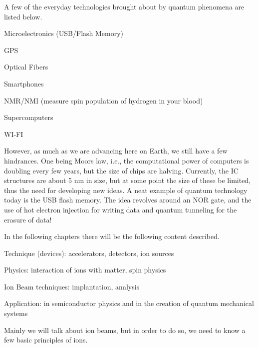A few of the everyday technologies brought about by quantum phenomena are listed below.
\begin{myitemize}
	\item Microelectronics (USB/Flash Memory)
	\item GPS
	\item Optical Fibers
	\item Smartphones
	\item NMR/NMI (measure spin population of hydrogen in your blood)
	\item Supercomputers
	\item WI-FI
\end{myitemize}

However, as much as we are advancing here on Earth, we still have a few hindrances.
One being Moors law, i.e., the computational power of computers is doubling every few years, but the size of chips are halving.
Currently, the IC structures are about 5 nm in size, but at some point the size of these be limited, thus the need for developing new ideas.
A neat example of quantum technology today is the USB flash memory.
The idea revolves around an NOR gate, and the use of hot electron injection for writing data and quantum tunneling for the erasure of data!

In the following chapters there will be the following content described.
\begin{myitemize}
	\item Technique (devices): accelerators, detectors, ion sources
	\item Physics: interaction of ions with matter, spin physics
	\item Ion Beam techniques: implantation, analysis
	\item Application: in semiconductor physics and in the creation of quantum mechanical systems
\end{myitemize}

Mainly we will talk about ion beams, but in order to do so, we need to know a few basic principles of ions.
